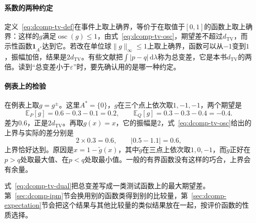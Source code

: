 \paragraph{系数的两种约定}
定义~\eqref{eq:dcomp-tv-def}在事件上取上确界，等价于在取值于$[0,1]$的函数上取上确界：这样的$g$满足$\operatorname{osc}(g)\leq1$，由式~\eqref{eq:dcomp-tv-osc}，期望差不超过$d_{\mathrm{TV}}$，而示性函数$\mathbf{1}_{A^{*}}$达到它。若改在单位球$\lVert g\rVert_{\infty}\leq1$上取上确界，函数可以从$-1$变到$1$，振幅加倍，结果是$2d_{\mathrm{TV}}$。有些文献把$\int\lvert p-q\rvert\,\mathrm{d}\lambda$称为总变差，它是本书$d_{\mathrm{TV}}$的两倍。读到“总变差小于$\varepsilon$”时，要先确认用的是哪一种约定。

\paragraph{例表上的检验}
在例表上取$g=g^{\pm}$。这里$A^{*}=\{0\}$，$g$在三个点上依次取$1,-1,-1$，两个期望是
\[
 \mathbb{E}_{P}[g]=0.6-0.3-0.1=0.2,\qquad\mathbb{E}_{Q}[g]=0.3-0.3-0.4=-0.4 .
\]
差为$0.6$，正是$2d_{\mathrm{TV}}$。再取$g(x)=x$，它的振幅是$2$，式~\eqref{eq:dcomp-tv-osc}给出的上界与实际的差分别是
\[
 2\times0.3=0.6,\qquad\lvert0.5-1.1\rvert=0.6,
\]
上界恰好达到。原因是$x=1-\tilde{g}(x)$，其中$\tilde{g}$在三点上依次取$1,0,-1$，而$\tilde{g}$正好在$p>q$处取最大值、在$p<q$处取最小值。一般的有界函数没有这样的巧合，上界会有余量。

式~\eqref{eq:dcomp-tv-dual}把总变差写成一类测试函数上的最大期望差。第~\ref{sec:dcomp-ipm}节会换用别的函数类得到别的比较量，第~\ref{sec:dcomp-expectation}节会把这个结果与其他比较量的类似结果放在一起，按评价函数的性质选择。
